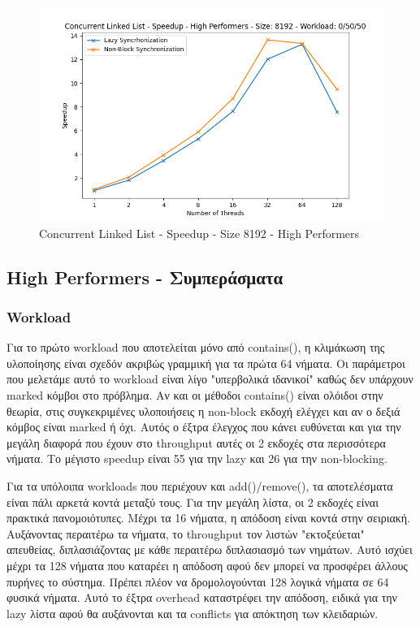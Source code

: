 \documentclass[../final_report.tex]{subfiles}
\begin{document}
\begin{figure}[H]
        \includegraphics[scale=0.4]{outFiles/plots/concurrent_data_structs_high_speedup_8192_0_50_50.png}
    \caption{Concurrent Linked List - Speedup - Size 8192 - High Performers}
    \label{fig:Concurrent Linked List - Speedup - Size 8192 - High Performers}
\end{figure}

\subsection*{High Performers - Συμπεράσματα}
\subsubsection*{Workload}
Για το πρώτο workload που αποτελείται μόνο από contains(), η κλιμάκωση της υλοποίησης είναι σχεδόν ακριβώς γραμμική
για τα πρώτα 64 νήματα. Οι παράμετροι που μελετάμε αυτό το workload είναι λίγο "υπερβολικά ιδανικοί" καθώς δεν υπάρχουν
marked κόμβοι στο πρόβλημα. Αν και οι μέθοδοι contains() είναι ολόιδοι στην θεωρία, στις συγκεκριμένες υλοποιήσεις η non-block
εκδοχή ελέγχει και αν ο δεξιά κόμβος είναι marked ή όχι. Αυτός ο έξτρα έλεγχος που κάνει ευθύνεται και για την μεγάλη διαφορά που
έχουν στο throughput αυτές οι 2 εκδοχές στα περισσότερα νήματα. Το μέγιστο speedup είναι 55 για την lazy και 26 για την non-blocking.

Για τα υπόλοιπα workloads που περιέχουν και add()/remove(), τα αποτελέσματα είναι πάλι αρκετά κοντά μεταξύ τους. Για την μεγάλη λίστα,
οι 2 εκδοχές είναι πρακτικά πανομοιότυπες. Μέχρι τα 16 νήματα, η απόδοση είναι κοντά στην σειριακή. Αυξάνοντας περαιτέρω τα νήματα, το 
throughput τον λιστών "εκτοξεύεται" απευθείας, διπλασιάζοντας με κάθε περαιτέρω διπλασιασμό των νημάτων. Αυτό ισχύει μέχρι τα 128 νήματα
που καταρέει η απόδοση αφού δεν μπορεί να προσφέρει άλλους πυρήνες το σύστημα. Πρέπει πλέον να δρομολογούνται 128 λογικά νήματα σε 64 φυσικά
νήματα. Αυτό το έξτρα overhead καταστρέφει την απόδοση, ειδικά για την lazy λίστα αφού θα αυξάνονται και τα conflicts για απόκτηση των
κλειδαριών. 
\end{document}
